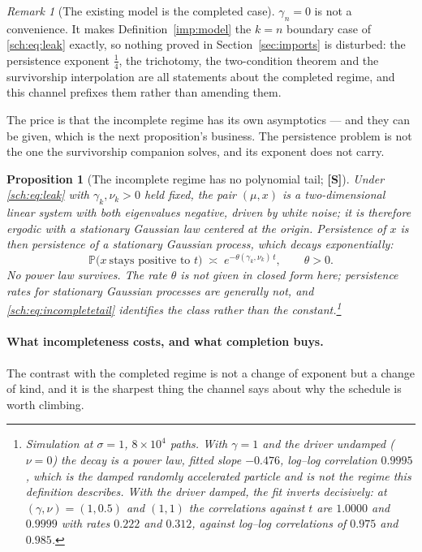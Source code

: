 \documentclass[11pt]{article}
\newcommand{\PP}{\mathbb{P}}
\theoremstyle{plain}
\newtheorem{proposition}[theorem]{Proposition}
\theoremstyle{definition}
\theoremstyle{remark}
\newtheorem{remark}[theorem]{Remark}
\begin{document}
\begin{remark}[The existing model is the completed case]
\label{sch:rem:limit}
$\gamma_n=0$ is not a convenience. It makes
Definition~\ref{imp:model} the $k=n$ boundary case of
\eqref{sch:eq:leak} exactly, so nothing proved in
Section~\ref{sec:imports} is disturbed: the
persistence exponent $\tfrac14$, the trichotomy, the two-condition
theorem and the survivorship interpolation are all statements about the
completed regime, and this channel prefixes them rather than amending
them.

The price is that the incomplete regime has its own asymptotics --- and
they can be given, which is the next proposition's business. The
persistence problem is not the one the survivorship companion \cite{SurvA} solves, and
its exponent does not carry.
\end{remark}

\begin{proposition}[The incomplete regime has no polynomial tail;
\textbf{[S]}]\label{sch:prop:exponent}
Under \eqref{sch:eq:leak} with $\gamma_k,\nu_k>0$ held fixed, the pair
$(\mu,x)$ is a two-dimensional linear system with both eigenvalues
negative, driven by white noise; it is therefore ergodic with a
stationary Gaussian law centered at the origin. Persistence of $x$ is then
persistence of a stationary Gaussian process, which decays
\emph{exponentially}:
\begin{equation}\label{sch:eq:incompletetail}
\PP\bigl(x\ \text{stays positive to }t\bigr)\;\asymp\;e^{-\theta(\gamma_k,\nu_k)\,t},
\qquad \theta>0 .
\end{equation}
No power law survives. The rate $\theta$ is not given in closed form
here; persistence rates for stationary Gaussian processes are generally
not, and \eqref{sch:eq:incompletetail} identifies the class rather than
the constant.\footnote{Simulation at $\sigma=1$, $8\times10^{4}$ paths.
With $\gamma=1$ and the driver \emph{undamped} ($\nu=0$) the decay is a
power law, fitted slope $-0.476$, log--log correlation $0.9995$, which is the damped randomly accelerated particle and is not the regime
this definition describes. With the driver damped, the fit inverts
decisively: at $(\gamma,\nu)=(1,0.5)$ and $(1,1)$ the correlations
against $t$ are $1.0000$ and $0.9999$ with rates $0.222$ and $0.312$,
against log--log correlations of $0.975$ and $0.985$.}
\end{proposition}

\paragraph{What incompleteness costs, and what completion buys.}\label{sch:rem:suspends}
The contrast with the completed regime is not a change of exponent but a
change of kind, and it is the sharpest thing the channel says about why
the schedule is worth climbing.
\end{document}
